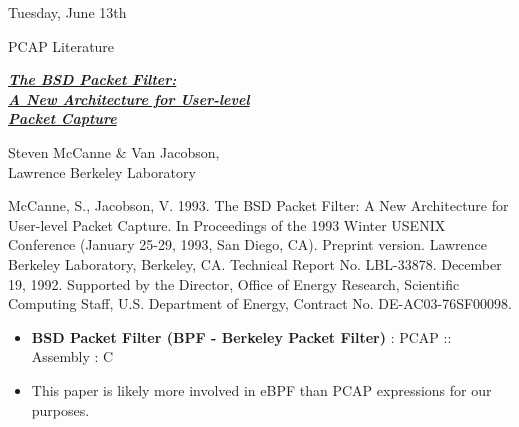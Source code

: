 \documentclass[11pt]{article}
\begin{document}
\begin{shininggoldbox}{Tuesday, June 13th\vspace{-2.2em}\begin{flushright}\large PCAP Literature \end{flushright}}
    \begin{multicols}{2}
        \large\textbf{\textit{\underline{The BSD Packet Filter:}}} \\ 
        \large\textbf{\textit{\underline{A New Architecture for User-level}}} \\
        \large\textbf{\textit{\underline{Packet Capture}}}
        \bigskip
        
        \normalsize Steven McCanne \& Van Jacobson, \\
        Lawrence Berkeley Laboratory
        \columnbreak
        \begin{mdframed}
            \tiny McCanne, S., Jacobson, V. 1993. The BSD Packet Filter: A New Architecture for User-level Packet Capture. In Proceedings of the 1993 Winter USENIX Conference (January 25-29, 1993, San Diego, CA). Preprint version. Lawrence Berkeley Laboratory, Berkeley, CA. Technical Report No. LBL-33878. December 19, 1992. Supported by the Director, Office of Energy Research, Scientific Computing Staff, U.S. Department of Energy, Contract No. DE-AC03-76SF00098.
        \end{mdframed}
        \vspace{-2em}
    \end{multicols}
    \vspace{-2em}
    \textbf{\hline}
    \begin{itemize}
        \normalsize\item\textbf{BSD Packet Filter (BPF - Berkeley Packet Filter)} : PCAP :: Assembly : C
        \vspace{-0.25em}
        \item This paper is likely more involved in eBPF than PCAP expressions for our purposes.
    \end{itemize}
\end{shininggoldbox}

\begin{center}
    \vspace{-0.25em}
    \hspace{0.2cm}
    \vspace{-0.4em}
\end{center}
\end{document}
